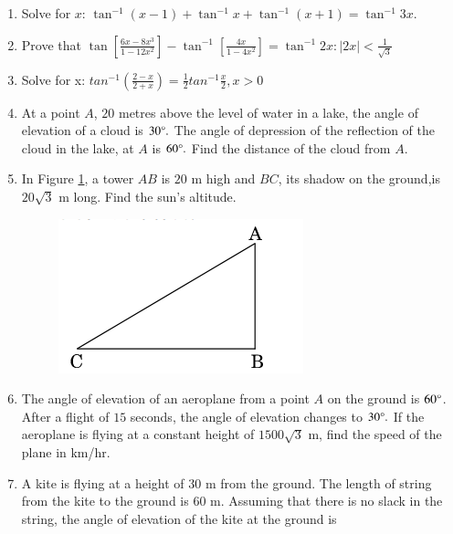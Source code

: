 \begin{enumerate}
\item Solve for $x$: $\tan^{-1}(x-1) + \tan^{-1}x + \tan^{-1}(x+1) = \tan^{-1}3x$.
\hfill{}\item Prove that $\tan[\frac{6x-8x^3}{1-12x^2}]-\tan^{-1}[\frac{4x}{1-4x^2}]=\tan^{-1}2x:|2x|<\frac{1}{\sqrt{3}}$
\hfill{}\item Solve for x: $tan^{-1}(\frac{2-x}{2+x}) = \frac{1}{2} tan^{-1}\frac{x}{2},x>0$
\hfill{}
\item At a point $A$, $20$ metres above the level of water in a lake, the angle of elevation of a cloud is $30 \degree.$ The angle of depression of the reflection of the cloud in the lake, at $A$ is $60\degree .$ Find the distance of the cloud from $A$.
\hfill{}\item In Figure \ref{Figure 1}, a tower $AB$ is $20$ m high and $BC$, its shadow on the ground,is $20\sqrt{3}$ m long. Find the sun's altitude.
\begin{figure}[h!]
	\centering
    \includegraphics[width=\columnwidth]{cbse/figs/cbse_30_3_1.png}
	\caption{}
	\label{Figure 1}
\end{figure}
\hfill{}\item The angle of elevation of an aeroplane from a point $A$ on the ground is $60 \degree  $. After a flight of $15$ seconds, the angle of elevation changes to $  30 \degree.$ If the aeroplane is flying at a constant height of $1500\sqrt{3}$ m, find the speed of the plane in km/hr.
\hfill{}
\item A kite is flying at a height of $30 \text{ m}$ from the ground. The length of string from the kite to the ground is $60 \text{ m}$. Assuming that there is no slack in the string, the angle of elevation of the kite at the ground is 

\end{enumerate}
